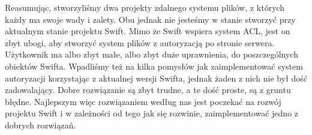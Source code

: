 	Reasumując, stworzyliśmy dwa projekty zdalnego systemu plików, z których każdy ma swoje wady i zalety. Obu jednak nie jesteśmy w stanie stworzyć przy aktualnym stanie projektu Swift. Mimo że Swift wspiera system ACL, jest on zbyt ubogi, aby stworzyć system plików z autoryzacją po stronie serwera. Użytkownik ma albo zbyt małe, albo zbyt duże uprawnienia, do poszczególnych obiektów Swifta. Wpadliśmy też na kilka pomysłów jak zaimplementować system autoryzacji korzystając z aktualnej wersji Swifta, jednak żaden z nich nie był dość zadowalający. Dobre rozwiązanie są zbyt trudne, a te dość proste, są z gruntu błędne. Najlepszym więc rozwiązaniem według nas jest poczekać na rozwój projektu Swift i w zależności od tego jak się rozwinie, zaimplementować jedno z dobrych rozwiązań.



